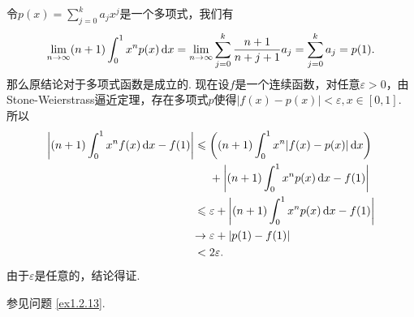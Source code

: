 \begin{ans}
  \method 令$p(x)=\sum_{j=0}^ka_jx^j$是一个多项式，我们有
  \[
    \lim_{n\to\infty}(n+1)\int_0^1x^np(x)\,\dx
    = \lim_{n\to\infty}\sum_{j=0}^k\frac{n+1}{n+j+1}a_j
    = \sum_{j=0}^k a_j = p(1).
  \]
  那么原结论对于多项式函数是成立的. 现在设$f$是一个连续函数，对任意$\varepsilon>0$，由Stone-Weierstrass逼近定理，存在多项式$p$使得$|f(x)-p(x)|<\varepsilon,x\in[0,1]$. 所以
  \begin{align*}
    \bigg| (n+1)\int_0^1x^nf(x)\,\mathrm dx - f(1) \bigg|
     \leqslant {}& \bigg( (n+1)\int_0^1x^n|f(x)-p(x)|\,\mathrm dx \bigg)\\
     & + \bigg| (n+1)\int_0^1x^np(x)\,\mathrm dx -f(1) \bigg|\\
     \leqslant {}& \varepsilon + \bigg| (n+1)\int_0^1x^np(x)\,\mathrm dx -f(1) \bigg|\\
     \to {}&  \varepsilon + |p(1)-f(1)| \\
     < {}& 2\varepsilon.
  \end{align*}
  由于$\varepsilon$是任意的，结论得证.

  \method 参见问题 \ref{ex1.2.13}.
\end{ans}

